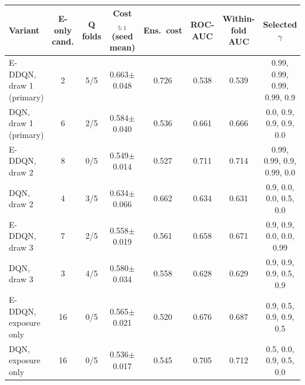 \begin{tabular}{lccccccc}
\toprule
Variant & E-only cand. & Q folds & Cost$_{5:1}$ (seed mean) & Ens.\ cost & ROC-AUC & Within-fold AUC & Selected $\gamma$ \\
\midrule
E-DDQN, draw 1 (primary) & 2 & 5/5 & 0.663$\pm$0.048 & 0.726 & 0.538 & 0.539 & 0.99, 0.99, 0.99, 0.99, 0.9 \\
DQN, draw 1 (primary) & 6 & 2/5 & 0.584$\pm$0.040 & 0.536 & 0.661 & 0.666 & 0.0, 0.9, 0.9, 0.9, 0.0 \\
E-DDQN, draw 2 & 8 & 0/5 & 0.549$\pm$0.014 & 0.527 & 0.711 & 0.714 & 0.99, 0.99, 0.9, 0.99, 0.0 \\
DQN, draw 2 & 4 & 3/5 & 0.634$\pm$0.066 & 0.662 & 0.634 & 0.631 & 0.9, 0.0, 0.0, 0.5, 0.0 \\
E-DDQN, draw 3 & 7 & 2/5 & 0.558$\pm$0.019 & 0.561 & 0.658 & 0.671 & 0.9, 0.9, 0.0, 0.0, 0.99 \\
DQN, draw 3 & 3 & 4/5 & 0.580$\pm$0.034 & 0.558 & 0.628 & 0.629 & 0.9, 0.9, 0.9, 0.5, 0.9 \\
E-DDQN, exposure only & 16 & 0/5 & 0.565$\pm$0.021 & 0.520 & 0.676 & 0.687 & 0.9, 0.5, 0.9, 0.9, 0.5 \\
DQN, exposure only & 16 & 0/5 & 0.536$\pm$0.017 & 0.545 & 0.705 & 0.712 & 0.5, 0.0, 0.9, 0.5, 0.0 \\
\bottomrule
\end{tabular}
